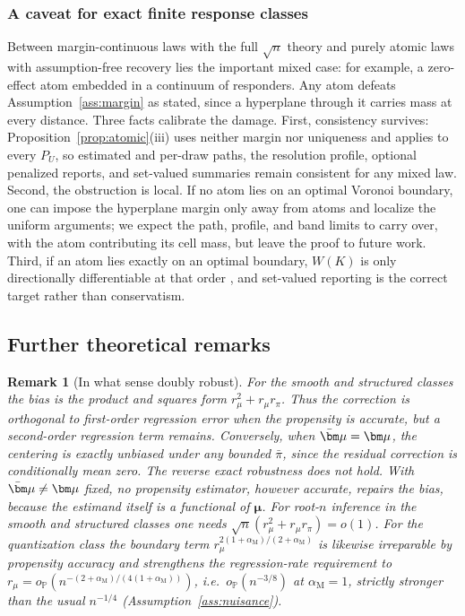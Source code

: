 \documentclass[11pt]{article}
\newtheorem{remark}{Remark}
\newcommand{\Pp}{\mathbb P}
\newcommand{\opro}{o_{\Pp}}
\newcommand{\bmu}{\bm\mu}
\newcommand{\am}{\alpha_{\mathrm M}}
\begin{document}
\subsubsection{A caveat for exact finite response classes}
\label{sec:atomic_supp_theory}

Between margin-continuous laws with the full $\sqrt n$ theory and purely atomic laws with assumption-free recovery lies the important mixed case: for example, a zero-effect atom embedded in a continuum of responders. Any atom defeats Assumption~\ref{ass:margin} as stated, since a hyperplane through it carries mass at every distance. Three facts calibrate the damage. First, consistency survives: Proposition~\ref{prop:atomic}(iii) uses neither margin nor uniqueness and applies to every $P_U$, so estimated and per-draw paths, the resolution profile, optional penalized reports, and set-valued summaries remain consistent for any mixed law. Second, the obstruction is local. If no atom lies on an optimal Voronoi boundary, one can impose the hyperplane margin only away from atoms and localize the uniform arguments; we expect the path, profile, and band limits to carry over, with the atom contributing its cell mass, but leave the proof to future work. Third, if an atom lies exactly on an optimal boundary, $W(K)$ is only directionally differentiable at that order \citep{fang2019}, and set-valued reporting is the correct target rather than conservatism.


\subsection{Further theoretical remarks}\label{sec:furtherremarks}

\begin{remark}[In what sense doubly robust]\label{rem:ratedr}
For the smooth and structured classes the bias is the product and squares form $r_\mu^2+r_\mu r_\pi$.  Thus the correction is orthogonal to first-order regression error when the propensity is accurate, but a second-order regression term remains.  Conversely, when $\bar\bmu=\bmu$, the centering is exactly unbiased under any bounded $\bar\pi$, since the residual correction is conditionally mean zero.  The reverse exact robustness does not hold. With $\bar\bmu\ne\bmu$ fixed, no propensity estimator, however accurate, repairs the bias, because the estimand itself is a functional of $\bmu$.  For root-$n$ inference in the smooth and structured classes one needs $\sqrt n(r_\mu^2+r_\mu r_\pi)=o(1)$. For the quantization class the boundary term $r_\mu^{2(1+\am)/(2+\am)}$ is likewise irreparable by propensity accuracy and strengthens the regression-rate requirement to $r_\mu=\opro(n^{-(2+\am)/(4(1+\am))})$, i.e.\ $\opro(n^{-3/8})$ at $\am=1$, strictly stronger than the usual $n^{-1/4}$ (Assumption~\ref{ass:nuisance}).
\end{remark}
\end{document}
